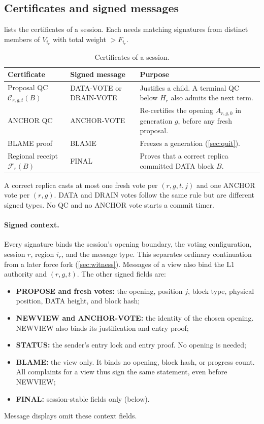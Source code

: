 \documentclass[11pt,a4paper]{article}
\newcommand{\QC}{\mathcal C}
\newcommand{\FC}{\mathcal F}
\begin{document}
\subsection{Certificates and signed messages}
\label{sec:certificates}
 lists the certificates of a session. Each needs
matching signatures from distinct members of $V_{i_r}$ with total weight
$>F_{i_r}$.

\begin{table}[htbp]\centering\small
\caption{Certificates of a session.}
\label{tab:certificates}
\begin{tabularx}{\linewidth}{@{}>{\raggedright\arraybackslash}p{.25\linewidth}>{\raggedright\arraybackslash}p{.24\linewidth}Y@{}}
\toprule
Certificate & Signed message & Purpose\\
\midrule
Proposal QC $\QC_{r,g,t}(B)$ & DATA-VOTE or DRAIN-VOTE & Justifies a
child. A terminal QC below $H_r$ also admits the next term.\\
ANCHOR QC & ANCHOR-VOTE & Re-certifies the opening $A_{r,g,0}$ in
generation $g$, before any fresh proposal.\\
BLAME proof & BLAME & Freezes a generation (\cref{sec:quit}).\\
Regional receipt $\FC_r(B)$ & FINAL & Proves that a correct replica
committed DATA block $B$.\\
\bottomrule
\end{tabularx}
\end{table}

A correct replica casts at most one fresh vote per $(r,g,t,j)$ and one
ANCHOR vote per $(r,g)$. DATA and DRAIN votes follow the same rule but
are different signed types. No QC and no ANCHOR vote starts a commit
timer.

\paragraph{Signed context.}
Every signature binds the session's opening boundary, the voting
configuration, session $r$, region $i_r$, and the message type. This
separates ordinary continuation from a later force fork
(\cref{sec:witness}). Messages of a view also bind the L1
authority and $(r,g,t)$. The other signed fields are:
\begin{itemize}
\item \textbf{PROPOSE and fresh votes:} the opening, position $j$, block
type, physical position, DATA height, and block hash;
\item \textbf{NEWVIEW and ANCHOR-VOTE:} the identity of the chosen
opening. NEWVIEW also binds its justification and entry proof;
\item \textbf{STATUS:} the sender's entry lock and entry proof. No
opening is needed;
\item \textbf{BLAME:} the view only. It binds no opening, block hash, or
progress count. All complaints for a view thus sign the same statement,
even before NEWVIEW;
\item \textbf{FINAL:} session-stable fields only (below).
\end{itemize}
Message displays omit these context fields.
\end{document}
